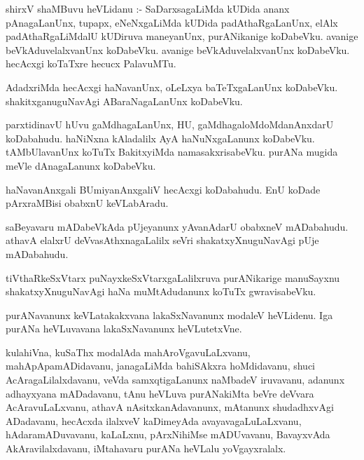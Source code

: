 \documentclass{article}
\begin{document}
\begin{mn}
shirxV  shaMBuvu  heVLidanu :- SaDarxsagaLiMda  kUDida  ananx pAnagaLanUnx,  tupapx,  eNeNxgaLiMda  kUDida  
padAthaRgaLanUnx,  elAlx  padAthaRgaLiMdalU  kUDiruva  maneyanUnx,  purANikanige  koDabeVku.  avanige  
beVkAduvelalxvanUnx  koDabeVku.  avanige  beVkAduvelalxvanUnx  koDabeVku.  hecAcxgi  koTaTxre  hecucx  PalavuMTu.
\end{mn}

\begin{mn}
AdadxriMda  hecAcxgi  haNavanUnx,  oLeLxya  baTeTxgaLanUnx  koDabeVku.  shakitxganuguNavAgi  ABaraNagaLanUnx  koDabeVku.
\end{mn}

\begin{mn}
parxtidinavU  hUvu  gaMdhagaLanUnx,  HU,  gaMdhagaloMdoMdanAnxdarU  koDabahudu.  haNiNxna  kAladalilx  AyA  
haNuNxgaLanunx  koDabeVku.  tAMbUlavanUnx  koTuTx  BakitxyiMda  namasakxrisabeVku.  purANa  mugida  meVle  
dAnagaLanunx  koDabeVku.
\end{mn}

\begin{mn}
haNavanAnxgali  BUmiyanAnxgaliV  hecAcxgi  koDabahudu.  EnU koDade  pArxraMBisi  obabxnU  keVLabAradu.
\end{mn}

\begin{mn}
saBeyavaru  mADabeVkAda  pUjeyanunx  yAvanAdarU  obabxneV  mADabahudu.  athavA  elalxrU  deVvasAthxnagaLalilx  
seVri  shakatxyXnuguNavAgi  pUje mADabahudu.
\end{mn}

\begin{mn}
tiVthaRkeSxVtarx  puNayxkeSxVtarxgaLalilxruva  purANikarige  manuSayxnu  shakatxyXnuguNavAgi  haNa  
muMtAdudanunx  koTuTx  gwravisabeVku.
\end{mn}

\begin{mn}
purANavanunx  keVLatakakxvana  lakaSxNavanunx  modaleV  heVLidenu.  Iga  purANa  heVLuvavana  
lakaSxNavanunx  heVLutetxVne.
\end{mn}

\begin{mn}
kulahiVna,  kuSaThx  modalAda  mahAroVgavuLaLxvanu,  mahApApamADidavanu,  janagaLiMda  bahiSAkxra hoMdidavanu,  
shuci  AcAragaLilalxdavanu,  veVda  samxqtigaLanunx  naMbadeV  iruvavanu,  adanunx  adhayxyana  mADadavanu,  
tAnu  heVLuva  purANakiMta  beVre  deVvara  AcAravuLaLxvanu,  athavA  nAsitxkanAdavanunx,  mAtanunx  shudadhxvAgi  
ADadavanu,  hecAcxda  ilalxveV  kaDimeyAda  avayavagaLuLaLxvanu,  hAdaramADuvavanu,  kaLaLxnu,  pArxNihiMse  
mADUvavanu,  BavayxvAda  AkAravilalxdavanu,  iMtahavaru  purANa  heVLalu  yoVgayxralalx.
\end{mn}
\end{document}
